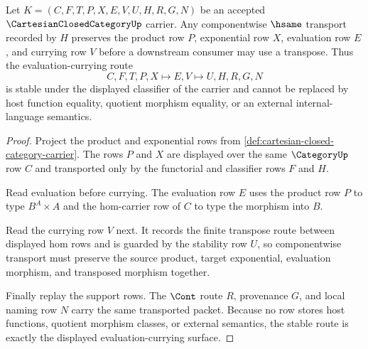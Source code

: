 \begin{theorem}
\label{thm:cartesian-closed-category-evaluation-currying-stability}
Let $K=(C,F,T,P,X,E,V,U,H,R,G,N)$ be an accepted $\CartesianClosedCategoryUp$ carrier. Any componentwise $\hsame$ transport recorded by $H$ preserves the product row $P$, exponential row $X$, evaluation row $E$, and currying row $V$ before a downstream consumer may use a transpose. Thus the evaluation-currying route
$$
C,F,T,P,X \longmapsto E,V \longmapsto U,H,R,G,N
$$
is stable under the displayed classifier of the carrier and cannot be replaced by host function equality, quotient morphism equality, or an external internal-language semantics.
\end{theorem}
\begin{proof}
Project the product and exponential rows from \autoref{def:cartesian-closed-category-carrier}. The rows $P$ and $X$ are displayed over the same $\CategoryUp$ row $C$ and transported only by the functorial and classifier rows $F$ and $H$.

Read evaluation before currying. The evaluation row $E$ uses the product row $P$ to type $B^A \times A$ and the hom-carrier row of $C$ to type the morphism into $B$.

Read the currying row $V$ next. It records the finite transpose route between displayed hom rows and is guarded by the stability row $U$, so componentwise transport must preserve the source product, target exponential, evaluation morphism, and transposed morphism together.

Finally replay the support rows. The $\Cont$ route $R$, provenance $G$, and local naming row $N$ carry the same transported packet. Because no row stores host functions, quotient morphism classes, or external semantics, the stable route is exactly the displayed evaluation-currying surface.
\end{proof}



